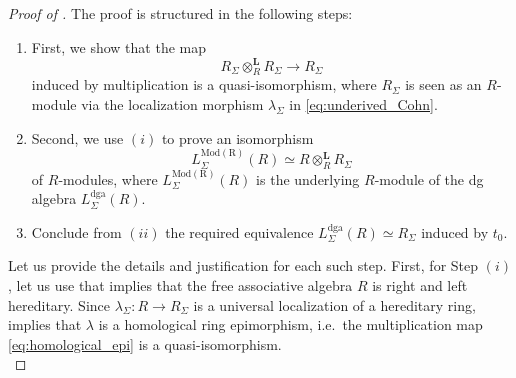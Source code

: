 \documentclass[11pt]{article}
\begin{document}
\begin{proof}[Proof of ] The proof is structured in the following steps:

\begin{enumerate}[label=$(\roman*)$]
    \item First, we show that the map
\begin{equation}\label{eq:homological_epi}
R_\Sigma\otimes_R^{\mathbf L}R_\Sigma\longrightarrow R_\Sigma
\end{equation}
induced by multiplication is a quasi-isomorphism, where $R_\Sigma$ is seen as an $R$-module via the localization morphism $\lambda_\Sigma$ in \eqref{eq:underived_Cohn}.

\item Second, we use $(i)$ to prove an isomorphism
\begin{equation}\label{eq:derived_localization}
L^{\mathrm{Mod(R)}}_\Sigma(R)\simeq R\otimes_R^{\mathbf L}R_\Sigma
\end{equation}
of $R$-modules, where $L^{\mathrm{Mod(R)}}_\Sigma(R)$ is the underlying $R$-module of the dg algebra $L^{\mathrm{dga}}_\Sigma(R)$.

\item Conclude from $(ii)$ the required equivalence $L^{\mathrm{dga}}_\Sigma(R)\simeq R_\Sigma$ induced by $t_0$.
\end{enumerate}

\noindent Let us provide the details and justification for each such step. First, for Step $(i)$, let us use that \cite[Corollary 4.3]{CohnBook} implies that the free associative algebra
\(R\) is right and left hereditary. Since \(\lambda_\Sigma:R\to R_\Sigma\) is a
universal localization of a hereditary ring, \cite[Theorem 6.1]{KrauseStovicek} implies that $\lambda$ is a homological ring
epimorphism, i.e.~the multiplication map \eqref{eq:homological_epi} is a quasi-isomorphism.\\


\end{proof}
\end{document}

